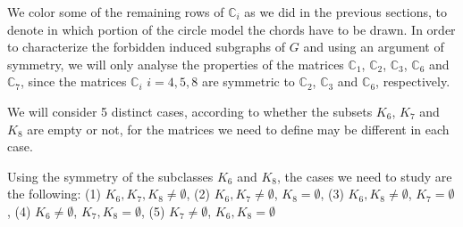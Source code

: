 \documentclass[12pt]{book}
\theoremstyle{plain}
\newcounter{cases}
\theoremstyle{remark}
\begin{document}
We color some of the remaining rows of $\mathbb C_i$ as we did in the previous sections, to denote in which portion of the circle model the chords have to be drawn. 
In order to characterize the forbidden induced subgraphs of $G$ and using an argument of symmetry, we will only analyse the properties of the matrices $\mathbb C_1$, $\mathbb C_2$, $\mathbb C_3$, $\mathbb C_6$ and $\mathbb C_7$, since the matrices $\mathbb C_i$ $i=4,5,8$ are symmetric to $\mathbb C_2$, $\mathbb C_3$ and $\mathbb C_6$, respectively.


We will consider 5 distinct cases, according to whether the subsets $K_6$, $K_7$ and $K_8$ are empty or not, for the matrices we need to define may be different in each case.

Using the symmetry of the subclasses $K_6$ and $K_8$, the cases we need to study are the following: (1) $K_6, K_7, K_8 \neq \emptyset$, (2) $K_6, K_7 \neq \emptyset$, $K_8 = \emptyset$, (3) $K_6, K_8 \neq \emptyset$, $K_7 = \emptyset$, (4) $K_6 \neq \emptyset$, $K_7, K_8 = \emptyset$, (5) $K_7 \neq \emptyset$, $K_6, K_8 = \emptyset$
\end{document}
